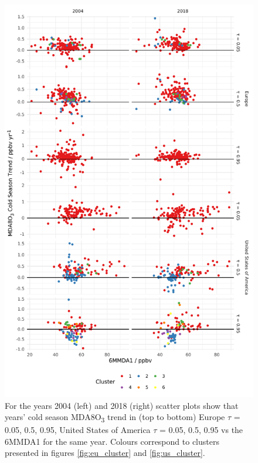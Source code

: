 \documentclass[journal abbreviation, manuscript]{copernicus}
\begin{document}
\begin{figure}[p]
\centering
\includegraphics[height=0.9\textheight]{figures/paper_figures/f11_mda8_cold_cluster_mda8_6mmda1.pdf}
\caption{For the years 2004 (left) and 2018 (right) scatter plots show that years' cold season MDA8O\textsubscript{3} trend in (top to bottom) Europe $\tau$ = 0.05, 0.5, 0.95, United States of America $\tau$ = 0.05, 0.5, 0.95 vs the 6MMDA1 for the same year. Colours correspond to clusters presented in figures \ref{fig:eu_cluster} and \ref{fig:us_cluster}.}
\label{fig:mda8_cold_cluster_mda8_6mmda1}
\end{figure}
\clearpage



\end{document}

